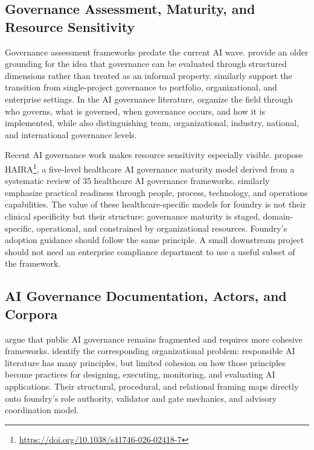 \documentclass[conference]{IEEEtran}
\begin{document}
\subsection{Governance Assessment, Maturity, and Resource Sensitivity}

Governance assessment frameworks predate the current AI wave. \cite{pyone2017governance} provide an older grounding for the idea that governance can be evaluated through structured dimensions rather than treated as an informal property. \cite{biesenthal2014multilevel} similarly support the transition from single-project governance to portfolio, organizational, and enterprise settings. In the AI governance literature, \cite{batool2025governance} organize the field through who governs, what is governed, when governance occurs, and how it is implemented, while also distinguishing team, organizational, industry, national, and international governance levels.

Recent AI governance work makes resource sensitivity especially visible. \cite{hussein2026haira} propose HAIRA\footnote{\url{https://doi.org/10.1038/s41746-026-02418-7}}, a five-level healthcare AI governance maturity model derived from a systematic review of 35 healthcare AI governance frameworks. \cite{kim2026ppto} similarly emphasize practical readiness through people, process, technology, and operations capabilities. The value of these healthcare-specific models for foundry is not their clinical specificity but their structure: governance maturity is staged, domain-specific, operational, and constrained by organizational resources. Foundry's adoption guidance should follow the same principle. A small downstream project should not need an enterprise compliance department to use a useful subset of the framework.

\subsection{AI Governance Documentation, Actors, and Corpora}

\cite{robles2023catching} argue that public AI governance remains fragmented and requires more cohesive frameworks. \cite{papagiannidis2025rai} identify the corresponding organizational problem: responsible AI literature has many principles, but limited cohesion on how those principles become practices for designing, executing, monitoring, and evaluating AI applications. Their structural, procedural, and relational framing maps directly onto foundry's role authority, validator and gate mechanics, and advisory coordination model.
\end{document}
